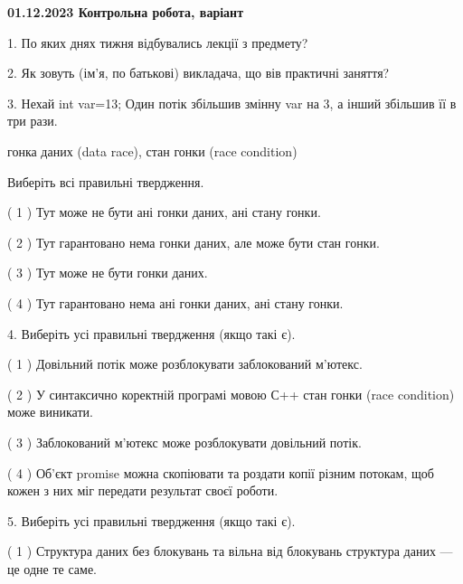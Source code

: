\documentclass[12pt, ukrainian]{article}
\begin{document}
\vspace{4mm}
\newpage
\begin {large}

\textbf{01.12.2023 Контрольна робота, варіант  }\par


{
1. По яких днях тижня відбувались лекції з предмету?



\vspace{5mm}
2. Як зовуть (ім'я, по батькові) викладача, що вів практичні заняття?



\vspace{5mm}
3. Нехай int var=13; Один потік збільшив змінну var на 3, а інший збільшив її в три рази.

гонка даних (data race), стан гонки (race condition)

Виберіть всі правильні твердження.\par
\vspace{2mm}
( 1 ) Тут може не бути ані гонки даних, ані стану гонки.%

( 2 ) Тут гарантовано нема гонки даних, але може бути стан гонки.%

( 3 ) Тут може не бути гонки даних.%

( 4 ) Тут гарантовано нема ані гонки даних, ані стану гонки.%


\vspace{5mm}
4. Виберіть усі правильні твердження (якщо такі є).\par
\vspace{2mm}

( 1 ) Довільний потік може розблокувати заблокований м’ютекс.%

( 2 ) У синтаксично коректній програмі мовою С++ стан гонки (race condition) може виникати.%

( 3 ) Заблокований м’ютекс може розблокувати довільний потік.%

( 4 ) Об’єкт promise можна скопіювати та роздати копії різним потокам, щоб кожен з них міг передати результат своєї роботи.%


\vspace{5mm}
5. Виберіть усі правильні твердження (якщо такі є).\par
\vspace{2mm}

( 1 ) Структура даних без блокувань та вільна від блокувань структура даних --- це одне те саме.%

}
\end{large}
\end{document}
